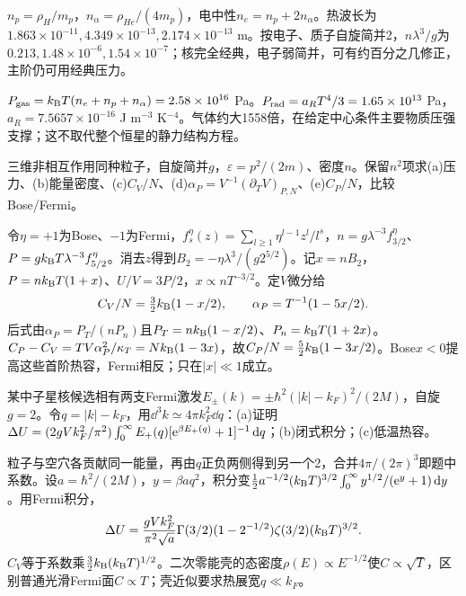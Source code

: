 \begin{solution}
$n_p=\rho_H/m_p$，$n_\alpha=\rho_{He}/(4m_p)$，电中性$n_e=n_p+2n_\alpha$。热波长为$1.863\times10^{-11},4.349\times10^{-13},2.174\times10^{-13}$ m。按电子、质子自旋简并2，$n\lambda^3/g$为$0.213,1.48\times10^{-6},1.54\times10^{-7}$；核完全经典，电子弱简并，可有约百分之几修正，主阶仍可用经典压力。

$P_{\rm gas}=k_{\mathrm B} T(n_e+n_p+n_\alpha)=2.58\times10^{16}$ Pa。$P_{\rm rad}=a_RT^4/3=1.65\times10^{13}$ Pa，$a_R=7.5657\times10^{-16}$ J m$^{-3}$ K$^{-4}$。气体约大1558倍，在给定中心条件主要物质压强支撑；这不取代整个恒星的静力结构方程。
\end{solution}
\begin{exercise}[原题3(a)--(e)]\label{p:333-6-3}
三维非相互作用同种粒子，自旋简并$g$，$\varepsilon=p^2/(2m)$、密度$n$。保留$n^2$项求(a)压力、(b)能量密度、(c)$C_V/N$、(d)$\alpha_P=V^{-1}(\partial_TV)_{P,N}$、(e)$C_P/N$，比较Bose/Fermi。
\end{exercise}
\begin{solution}
令$\eta=+1$为Bose、$-1$为Fermi，$f_s^\eta(z)=\sum_{l\ge1}\eta^{l-1}z^l/l^s$，$n=g\lambda^{-3}f_{3/2}^\eta$、$P=gk_{\mathrm B} T\lambda^{-3}f_{5/2}^\eta$。消去$z$得到$B_2=-\eta\lambda^3/(g2^{5/2})$。记$x=nB_2$，$P=nk_{\mathrm B} T(1+x)$、$U/V=3P/2$，$x\propto nT^{-3/2}$。定$V$微分给
\begin{equation}
C_V/N=\tfrac32k_{\mathrm B}(1-x/2),\qquad
\alpha_P=T^{-1}(1-5x/2).
\end{equation}
后式由$\alpha_P=P_T/(nP_n)$且$P_T=nk_{\mathrm B}(1-x/2)$、$P_n=k_{\mathrm B} T(1+2x)$。$C_P-C_V=TV\alpha_P^2/\kappa_T=Nk_{\mathrm B}(1-3x)$，故$C_P/N=\tfrac52k_{\mathrm B}(1-3x/2)$。Bose$x<0$提高这些首阶热容，Fermi相反；只在$|x|\ll1$成立。
\end{solution}
\begin{exercise}[原题4(a)--(c)]\label{p:333-6-4}
某中子星核候选相有两支Fermi激发$E_\pm(k)=\pm\hbar^2(|k|-k_F)^2/(2M)$，自旋$g=2$。令$q=|k|-k_F$，用$\dd^3k\simeq4\pi k_F^2\dd q$：(a)证明$\Delta U=(2gVk_F^2/\pi^2)\int_0^\infty E_+(q)[\mathrm e^{\beta E_+(q)}+1]^{-1}\,\mathrm d q$；(b)闭式积分；(c)低温热容。
\end{exercise}
\begin{solution}
粒子与空穴各贡献同一能量，再由$q$正负两侧得到另一个2，合并$4\pi/(2\pi)^3$即题中系数。设$a=\hbar^2/(2M)$，$y=\beta aq^2$，积分变$\tfrac12 a^{-1/2}(k_{\mathrm B} T)^{3/2}\int_0^\infty y^{1/2}/(\mathrm e^y+1)\,\mathrm d y$。用Fermi积分，
\begin{equation}
\Delta U=\frac{gVk_F^2}{\pi^2\sqrt a}\Gamma(3/2)(1-2^{-1/2})\zeta(3/2)(k_{\mathrm B} T)^{3/2}.
\end{equation}
$C_V$等于系数乘$\tfrac32k_{\mathrm B}(k_{\mathrm B} T)^{1/2}$。二次零能壳的态密度$\rho(E)\propto E^{-1/2}$使$C\propto\sqrt T$，区别普通光滑Fermi面$C\propto T$；壳近似要求热展宽$q\ll k_F$。
\end{solution}
